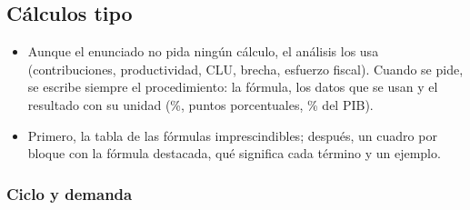 \documentclass[11pt]{article}
\begin{document}
\subsection{Cálculos tipo}\label{anexo:calculos}

\begin{itemize}
\item Aunque el enunciado no pida ningún cálculo, el análisis los usa (contribuciones, productividad, CLU, brecha, esfuerzo fiscal). Cuando se pide, se escribe siempre el procedimiento: la fórmula, los datos que se usan y el resultado con su unidad (\%, puntos porcentuales, \% del PIB).
\item Primero, la tabla de las fórmulas imprescindibles; después, un cuadro por bloque con la fórmula destacada, qué significa cada término y un ejemplo.
\end{itemize}


\subsubsection{Ciclo y demanda}\label{anexo:calc-ciclo}
\end{document}
